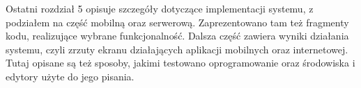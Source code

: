 Ostatni rozdział 5 opisuje szczegóły dotyczące implementacji systemu, z podziałem na część mobilną oraz serwerową. Zaprezentowano tam też fragmenty kodu, realizujące wybrane funkcjonalność. Dalsza część zawiera wyniki działania systemu, czyli zrzuty ekranu działających aplikacji mobilnych oraz internetowej. Tutaj opisane są też sposoby, jakimi testowano oprogramowanie oraz środowiska i edytory użyte do jego pisania.

